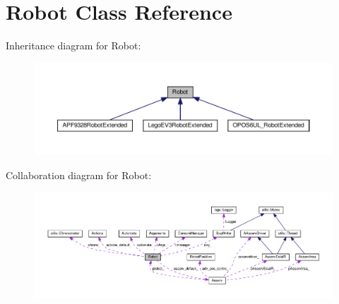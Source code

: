\hypertarget{classRobot}{}\section{Robot Class Reference}
\label{classRobot}


Inheritance diagram for Robot\+:
\nopagebreak
\begin{figure}[H]
\begin{center}
\leavevmode
\includegraphics[width=350pt]{classRobot__inherit__graph}
\end{center}
\end{figure}


Collaboration diagram for Robot\+:
\nopagebreak
\begin{figure}[H]
\begin{center}
\leavevmode
\includegraphics[width=350pt]{classRobot__coll__graph}
\end{center}
\end{figure}

